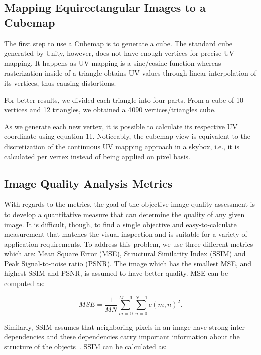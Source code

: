 \documentclass[10pt,conference]{IEEEtran}
\begin{document}
\subsection{ Mapping Equirectangular Images to a Cubemap} \label{subsec:equiconvtocubemap}

The first step to use a Cubemap is to generate a cube. The standard cube generated by Unity, however, does not have enough vertices for precise UV mapping. It happens as UV mapping is a sine/cosine function whereas rasterization inside of a triangle obtains UV values through linear interpolation of its vertices, thus causing distortions.

For better results, we divided each triangle into four parts. From a cube of 10 vertices and 12 triangles, we obtained a 4090 vertices/triangles cube.

As we generate each new vertex, it is possible to calculate its respective UV coordinate using equation 11. Noticeably, the cubemap view is equivalent to the discretization of the continuous UV mapping approach in a skybox, i.e., it is calculated per vertex instead of being applied on pixel basis.

\subsection{Image Quality Analysis Metrics} \label{metrics}
With regards to the metrics, the goal of the objective image quality assessment is to develop a quantitative measure that can determine the quality of any given image. It is difficult, though, to find a single objective and easy-to-calculate measurement that matches the visual inspection and is suitable for a variety of application requirements. To address this problem, we use three different metrics which are:
Mean Square Error (MSE), Structural Similarity Index (SSIM) and Peak Signal-to-noise ratio (PSNR). The image which has the smallest MSE, and highest SSIM and PSNR, is assumed to have better quality. MSE can be computed as:

\begin{equation}
MSE=\frac{1}{MN}\sum_{m=0}^{M-1}{\sum_{n=0}^{N-1}{e(m,n)^2}}.
\label{eq:mse}
\end{equation}

Similarly, SSIM assumes that neighboring pixels in an image have strong inter-dependencies and these dependencies carry important information about the structure of the objects~\cite{wang2004image}. SSIM can be calculated as:
\end{document}
